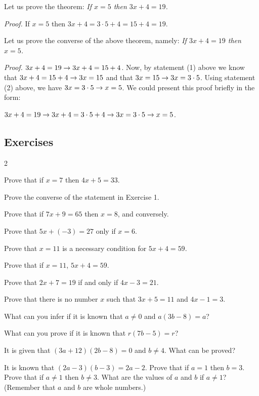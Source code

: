 \documentclass[11pt]{book}
\begin{document}
Let us prove the theorem: \emph{If $x = 5$ then $3x + 4 = 19$.}

\medskip
\noindent\emph{Proof.} If $x = 5$ then $3x + 4 = 3 \cdot 5 + 4 = 15 + 4 = 19$.

\medskip
Let us prove the converse of the above theorem, namely: \emph{If $3x + 4 = 19$
then $x = 5$.}

\medskip
\noindent\emph{Proof.} $3x + 4 = 19 \rightarrow 3x + 4 = 15 + 4$. Now, by statement (1)
above we know that $3x + 4 = 15 + 4 \rightarrow 3x = 15$ and that $3x = 15 \rightarrow 3x =
3 \cdot 5$. Using statement (2) above, we have $3x = 3 \cdot 5 \rightarrow x = 5$. We
could present this proof briefly in the form:

\begin{center}
$3x + 4 = 19 \rightarrow 3x + 4 = 3 \cdot 5 + 4 \rightarrow 3x = 3 \cdot 5 \rightarrow x = 5$.
\end{center}

\subsection*{Exercises}

\begin{multicols}{2}
\begin{exlist}
\item Prove that if $x = 7$ then $4x + 5 = 33$.
\item Prove the converse of the statement in Exercise 1.
\item Prove that if $7x + 9 = 65$ then $x = 8$, and conversely.
\item Prove that $5x + (-3) = 27$ only if $x = 6$.
\item Prove that $x = 11$ is a necessary condition for $5x + 4 = 59$.
\item Prove that if $x = 11$, $5x + 4 = 59$.
\item Prove that $2x + 7 = 19$ if and only if $4x - 3 = 21$.
\item Prove that there is no number $x$ such that $3x + 5 = 11$ and $4x - 1 = 3$.
\item What can you infer if it is known that $a \neq 0$ and $a(3b - 8) = a$?
\item What can you prove if it is known that $r(7b - 5) = r$?
\item It is given that $(3a + 12)(2b - 8) = 0$ and $b \neq 4$. What can be proved?
\item[\stex 12.] It is known that $(2a - 3)(b - 3) = 2a - 2$. Prove that if
      $a = 1$ then $b = 3$. Prove that if $a \neq 1$ then $b \neq 3$. What are the
      values of $a$ and $b$ if $a \neq 1$? (Remember that $a$ and $b$ are whole
      numbers.)
\end{exlist}
\end{multicols}
\end{document}
